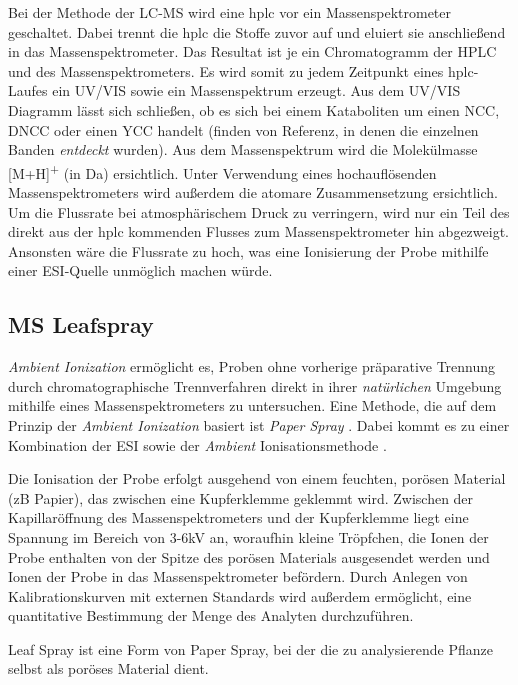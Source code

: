 Bei der Methode der LC-MS wird eine \gls{hplc} vor ein Massenspektrometer geschaltet. Dabei trennt die \gls{hplc} die Stoffe zuvor auf und eluiert sie anschließend in das Massenspektrometer. \cite[S. 217-218]{MassSpectrometry} Das Resultat ist je ein Chromatogramm der HPLC und des Massenspektrometers. Es wird somit zu jedem Zeitpunkt eines \gls{hplc}-Laufes ein UV/VIS sowie ein Massenspektrum erzeugt. Aus dem UV/VIS Diagramm lässt sich schließen, ob es sich bei einem Kataboliten um einen \gls{NCC}, \gls{DNCC} oder einen \gls{YCC} handelt (finden von Referenz, in denen die einzelnen Banden \textit{entdeckt} wurden). Aus dem Massenspektrum wird die Molekülmasse [M+H]\textsuperscript{+} (in Da) ersichtlich. Unter Verwendung eines hochauflösenden Massenspektrometers wird außerdem die atomare Zusammensetzung ersichtlich. \\

Um die Flussrate bei atmosphärischem Druck zu verringern, wird nur ein Teil des direkt aus der \gls{hplc} kommenden Flusses zum Massenspektrometer hin abgezweigt. Ansonsten wäre die Flussrate zu hoch, was eine Ionisierung der Probe mithilfe einer \gls{ESI}-Quelle unmöglich machen würde. \cite[S. 221]{MassSpectrometry}


\subsection{MS Leafspray} \label{sec:MSLeafspray}

\textit{Ambient Ionization} \cite{AmbientIonisation} ermöglicht es, Proben ohne vorherige präparative Trennung durch chromatographische Trennverfahren direkt in ihrer \textit{natürlichen} Umgebung mithilfe eines Massenspektrometers zu untersuchen. Eine Methode, die auf dem Prinzip der \textit{Ambient Ionization} basiert ist \textit{Paper Spray} \cite{PaperSpray}. Dabei  kommt es zu einer Kombination der \gls{ESI} sowie der \textit{Ambient} Ionisationsmethode \cite{PaperSpray}. 

Die Ionisation der Probe erfolgt ausgehend von einem feuchten, porösen Material (\gls{zB} Papier), das zwischen eine Kupferklemme geklemmt wird. Zwischen der Kapillaröffnung des Massenspektrometers und der Kupferklemme liegt eine Spannung im Bereich von 3-6kV an, woraufhin kleine Tröpfchen, die Ionen der Probe enthalten von der Spitze des porösen Materials ausgesendet werden und Ionen der Probe in das Massenspektrometer befördern. \cite{RapidScreeningLeafSpray} Durch Anlegen von Kalibrationskurven mit externen Standards wird außerdem ermöglicht, eine quantitative Bestimmung der Menge des Analyten durchzuführen. \cite{LeafSpray}

Leaf Spray ist eine Form von Paper Spray, bei der die zu analysierende Pflanze selbst als poröses Material dient. 

